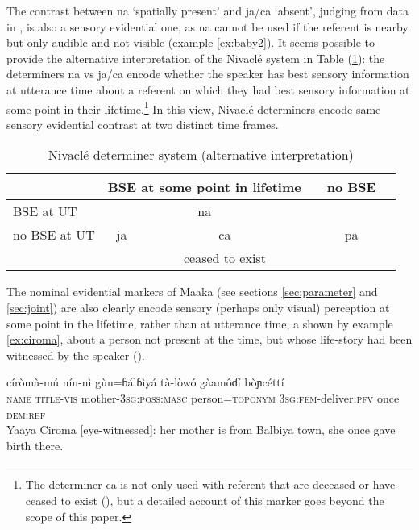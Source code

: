 \documentclass[oneside,a4paper,11pt]{article}
\newcommand{\ipa}[1]{{\phon \mbox{#1}}} %
\begin{document}
The contrast between \ipa{na} `spatially present' and \ipa{ja/ca} `absent', judging from data in \citet{gutierrez14determiners}, is also a sensory evidential one, as \ipa{na} cannot be used if the referent is nearby but only audible and not visible (example \ref{ex:baby2}). It seems possible to provide the alternative interpretation of the Nivaclé system in Table (\ref{tab:nivakle2}): the determiners \ipa{na} vs \ipa{ja/ca} encode whether the speaker has best sensory information at utterance time about a referent on which they had best sensory information at some point in their lifetime.\footnote{The determiner \ipa{ca} is not only used with referent that are deceased or have ceased to exist (\citealt[63-4]{fabre14nivacle}), but a detailed account of this marker goes beyond the scope of this paper. } In this view, Nivaclé determiners encode same sensory evidential contrast at two distinct time frames.
  
 
\begin{table}[H]
\caption{Nivaclé determiner system (alternative interpretation) } \centering \label{tab:nivakle2}
\begin{tabular}{l|c|cc|cc}
\toprule
&\multicolumn{2}{c}{BSE at some point in lifetime} && no BSE \\
\hline
BSE at UT& \multicolumn{2}{c}{\ipa{na}}&& \\
\cline{1-4}
no BSE at UT&\ipa{ja} & \ipa{ca}&&\ipa{pa}& \\
&&ceased to exist&\\
\bottomrule
\end{tabular}
\end{table}

The nominal evidential markers of Maaka (see sections \ref{sec:parameter} and \ref{sec:joint}) are also clearly encode sensory (perhaps only visual) perception at some point in the lifetime, rather than at utterance time, a shown by example \ref{ex:ciroma}, about a person not present at the time, but whose life-story had been witnessed by the speaker (\citealt[196]{storch14maaka}).

\begin{exe}
\ex \label{ex:ciroma}
\gll \ipa{yáayà} \ipa{círòmà-mú} \ipa{nín-nì} \ipa{gùu=ɓálɓìyá} \ipa{tà-lòwó} \ipa{gàamôɗí} \ipa{bòɲcéttí} \\
\textsc{name} \textsc{title-vis} mother-\textsc{3sg:poss:masc} person=\textsc{toponym} \textsc{3sg:fem}-deliver:\textsc{pfv} once \textsc{dem:ref} \\
\glt Yaaya Ciroma [eye-witnessed]: her mother is from Balbiya town, she once gave birth there.
\end{exe}
\end{document}
